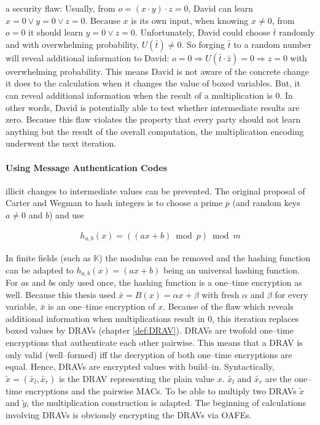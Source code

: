 a security flaw: Usually, from $o = (x \cdot y) \cdot z = 0$, David can learn $x
= 0 \vee y = 0 \vee z = 0$. Because $x$ is its own input, when knowing $x \neq
0$, from $o = 0$ it should learn $y = 0 \vee z = 0$.  Unfortunately, David could
choose $\bar{t}$ randomly and with overwhelming probability, $U(\bar{t}) \neq
0$. So forging $\bar{t}$ to a random number will reveal additional information
to David: $o = 0 \Rightarrow U(\bar{t} \cdot \bar{z}) = 0 \Rightarrow z = 0$
with overwhelming probability. This means David is not aware of the concrete
change it does to the calculation when it changes the value of boxed variables.
But, it can reveal additional information when the result of a multiplication is
$0$. In other words, David is potentially able to test whether intermediate
results are zero. Because this flaw violates the property that every party
should not learn anything but the result of the overall computation, the
multiplication encoding underwent the next iteration.

\paragraph{Using Message Authentication Codes} illicit changes to intermediate
values can be prevented. The original proposal of Carter and Wegman
\cite{carter79} to hash integers is to choose a prime $p$ (and random keys $a
\neq 0$ and $b$) and use

\begin{align*}
  h_{a,b}(x) = ((ax + b) \bmod p) \bmod m
\end{align*}

\noindent{}In finite fields (such as $\mathbb{K}$) the modulus can be removed
and the hashing function can be adapted to $h_{a,b}(x) = (ax + b)$ being an
universal hashing function. For $a$s and $b$s only used once, the hashing
function is a one--time encryption as well. Because this thesis used $\bar{x} =
B(x) = \alpha x + \beta$ with fresh $\alpha$ and $\beta$ for every variable,
$\bar{x}$ is an one--time encryption of $x$. Because of the flaw which reveals
additional information when multiplications result in $0$, this iteration
replaces boxed values by DRAVs (chapter \ref{def:DRAV}). DRAVs are twofold
one--time encryptions that authenticate each other pairwise. This means that a
DRAV is only valid (well--formed) iff the decryption of both one--time
encryptions are equal. Hence, DRAVs are encrypted values with  build--in. Syntactically, $\widetilde{x} =
(\widetilde{x_l}, \widetilde{x_r})$ is the DRAV representing the plain value
$x$. $\widetilde{x_l}$ and $\widetilde{x_r}$ are the one--time encryptions and
the pairwise MACs. To be able to multiply two DRAVs $\widetilde{x}$ and
$\widetilde{y}$, the multiplication construction is adapted. The beginning of
calculations involving DRAVs is obviously encrypting the DRAVs via OAFEs.

